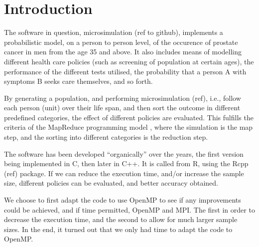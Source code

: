 \section{Introduction}

The software in question, microsimulation (ref to github), implements
a probabilistic model, on a person to person level, of the occurence
of prostate cancer in men from the age 35 and above. It also includes
means of modelling different health care policies (such as screening
of population at certain ages), the performance of the different tests
utilised, the probability that a person A with symptoms B seeks care
themselves, and so forth.

By generating a population, and performing microsimulation (ref),
i.e., follow each person (unit) over their life span, and then sort
the outcome in different predefined categories, the effect of
different policies are evaluated. This fulfills the criteria of the
MapReduce programming model \cite{MapReduce:2004}, where the
simulation is the map step, and the sorting into different categories
is the reduction step.

The software has been developed ``organically'' over the years, the
first version being implemented in C, then later in C++. It is called
from R, using the Rcpp (ref) package. If we can reduce the execution
time, and/or increase the sample size, different policies can be
evaluated, and better accuracy obtained.

We choose to first adapt the code to use OpenMP to see if any
improvements could be achieved, and if time permitted, OpenMP and
MPI. The first in order to decrease the execution time, and the second
to allow for much larger sample sizes. In the end, it turned out that
we only had time to adapt the code to OpenMP.







